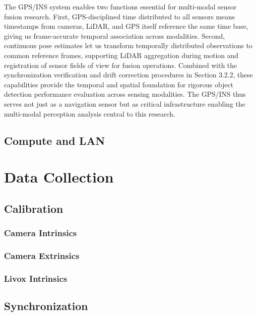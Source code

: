\documentclass{erauthesis}
\begin{document}
The \ac{GPS}/\ac{INS} system enables two functions essential for multi-modal sensor fusion research.
First, \ac{GPS}-disciplined time distributed to all sensors means timestamps from cameras, \ac{LiDAR}, and \ac{GPS} itself reference the same time base, giving us frame-accurate temporal association across modalities.
Second, continuous pose estimates let us transform temporally distributed observations to common reference frames, supporting \ac{LiDAR} aggregation during motion and registration of sensor fields of view for fusion operations.
Combined with the synchronization verification and drift correction procedures in Section 3.2.2, these capabilities provide the temporal and spatial foundation for rigorous object detection performance evaluation across sensing modalities.
The \ac{GPS}/\ac{INS} thus serves not just as a navigation sensor but as critical infrastructure enabling the multi-modal perception analysis central to this research.

        \subsection{Compute and LAN}
        
    \section{Data Collection}
    
        \subsection{Calibration}
        
            \subsubsection{Camera Intrinsics}
            
            \subsubsection{Camera Extrinsics}
            
            \subsubsection{Livox Intrinsics}
            
        \subsection{Synchronization}
        
\end{document}
